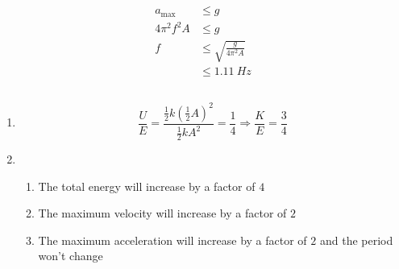 \documentclass{article}
\begin{document}
\subsection{}

\begin{align*}
  a_\text{max}  & \le g                          \\
  4 \pi^2 f^2 A & \le g                          \\
  f             & \le \sqrt{\frac{g}{4 \pi^2 A}} \\
                & \le \qty{1.11}{Hz}
\end{align*}

\subsection{}

\begin{enumerate}
  \item \[\frac{U}{E} = \frac{\frac{1}{2} k \left( \frac{1}{2} A \right)^2}{\frac{1}{2} k A^2} = \frac{1}{4} \Rightarrow \frac{K}{E} = \frac{3}{4}\]

  \item

        \begin{enumerate}
          \item The total energy will increase by a factor of $4$

          \item The maximum velocity will increase by a factor of $2$

          \item The maximum acceleration will increase by a factor of $2$ and the period won't change
        \end{enumerate}
\end{enumerate}

\subsection{}
\end{document}
